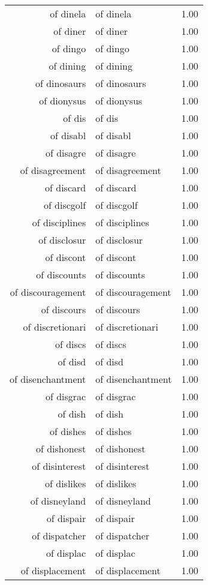 \begin{table}[ht]
\begin{tabular}{rlr}
  of dinela & of dinela & 1.00 \\ 
  of diner & of diner & 1.00 \\ 
  of dingo & of dingo & 1.00 \\ 
  of dining & of dining & 1.00 \\ 
  of dinosaurs & of dinosaurs & 1.00 \\ 
  of dionysus & of dionysus & 1.00 \\ 
  of dis & of dis & 1.00 \\ 
  of disabl & of disabl & 1.00 \\ 
  of disagre & of disagre & 1.00 \\ 
  of disagreement & of disagreement & 1.00 \\ 
  of discard & of discard & 1.00 \\ 
  of discgolf & of discgolf & 1.00 \\ 
  of disciplines & of disciplines & 1.00 \\ 
  of disclosur & of disclosur & 1.00 \\ 
  of discont & of discont & 1.00 \\ 
  of discounts & of discounts & 1.00 \\ 
  of discouragement & of discouragement & 1.00 \\ 
  of discours & of discours & 1.00 \\ 
  of discretionari & of discretionari & 1.00 \\ 
  of discs & of discs & 1.00 \\ 
  of disd & of disd & 1.00 \\ 
  of disenchantment & of disenchantment & 1.00 \\ 
  of disgrac & of disgrac & 1.00 \\ 
  of dish & of dish & 1.00 \\ 
  of dishes & of dishes & 1.00 \\ 
  of dishonest & of dishonest & 1.00 \\ 
  of disinterest & of disinterest & 1.00 \\ 
  of dislikes & of dislikes & 1.00 \\ 
  of disneyland & of disneyland & 1.00 \\ 
  of dispair & of dispair & 1.00 \\ 
  of dispatcher & of dispatcher & 1.00 \\ 
  of displac & of displac & 1.00 \\ 
  of displacement & of displacement & 1.00 \\ 

\end{tabular}
\end{table}
